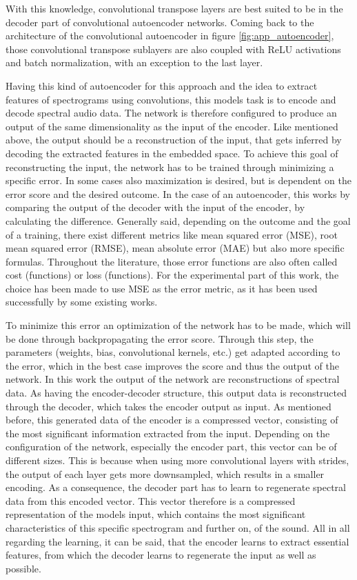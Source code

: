 With this knowledge, convolutional transpose layers are best suited to be in the decoder part of convolutional autoencoder networks. Coming back to the architecture of the convolutional autoencoder in figure \ref{fig:app_autoencoder}, those convolutional transpose sublayers are also coupled with ReLU activations and batch normalization, with an exception to the last layer.

Having this kind of autoencoder for this approach and the idea to extract features of spectrograms using convolutions, this models task is to encode and decode spectral audio data. The network is therefore configured to produce an output of the same dimensionality as the input of the encoder. Like mentioned above, the output should be a reconstruction of the input, that gets inferred by decoding the extracted features in the embedded space. To achieve this goal of reconstructing the input, the network has to be trained through minimizing a specific error. In some cases also maximization is desired, but is dependent on the error score and the desired outcome. In the case of an autoencoder, this works by comparing the output of the decoder with the input of the encoder, by calculating the difference. Generally said, depending on the outcome and the goal of a training, there exist different metrics like mean squared error (MSE), root mean squared error (RMSE), mean absolute error (MAE) but also more specific formulas. Throughout the literature, those error functions are also often called cost (functions) or loss (functions). For the experimental part of this work, the choice has been made to use MSE as the error metric, as it has been used successfully by some existing works. 

To minimize this error an optimization of the network has to be made, which will be done through backpropagating the error score. Through this step, the parameters (weights, bias, convolutional kernels, etc.) get adapted according to the error, which in the best case improves the score and thus the output of the network. In this work the output of the network are reconstructions of spectral data. As having the encoder-decoder structure, this output data is reconstructed through the decoder, which takes the encoder output as input. As mentioned before, this generated data of the encoder is a compressed vector, consisting of the most significant information extracted from the input. Depending on the configuration of the network, especially the encoder part, this vector can be of different sizes. This is because when using more convolutional layers with strides, the output of each layer gets more downsampled, which results in a smaller encoding. As a consequence, the decoder part has to learn to regenerate spectral data from this encoded vector. This vector therefore is a compressed representation of the models input, which contains the most significant characteristics of this specific spectrogram and further on, of the sound. All in all regarding the learning, it can be said, that the encoder learns to extract essential features, from which the decoder learns to regenerate the input as well as possible.

